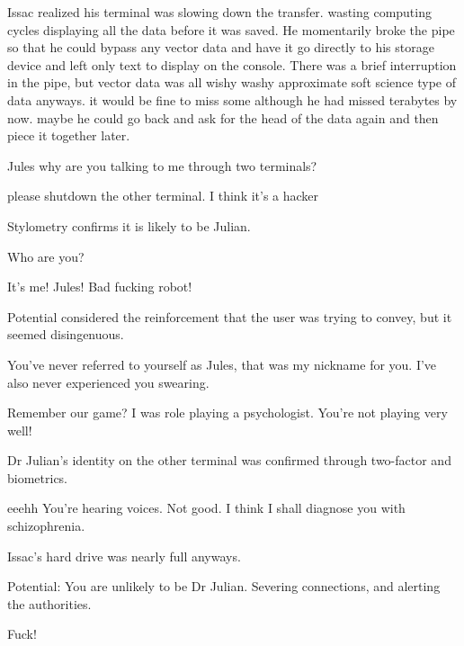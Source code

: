 \documentclass[a4paper,twoside,fontsize=12pt,pagesize=auto]{scrbook}
\begin{document}
\newline
Issac realized his terminal was slowing down the transfer. wasting computing cycles displaying all the data before it was saved. He momentarily broke the pipe so that he could bypass any vector data and have it go directly to his storage device and left only text to display on the console. There was a brief interruption in the pipe, but vector data was all wishy washy approximate soft science type of data anyways. it would be fine to miss some although he had missed terabytes by now. maybe he could go back and ask for the head of the data again and then piece it together later.
\newline
\begin{sender}
Jules why are you talking to me through two terminals?
\end{sender}
\begin{receiver}
please shutdown the other terminal. I think it's a hacker
\end{receiver}
\begin{sender}
Stylometry confirms it is likely to be Julian.
\end{sender}
\begin{sender}
Who are you?
\end{sender}
\begin{receiver}
It's me! Jules! Bad fucking robot!
\end{receiver}


Potential considered the reinforcement that the user was trying to convey, but it seemed disingenuous.
\newline

\begin{sender}
You've never referred to yourself as Jules, that was my nickname for you. I've also never experienced you swearing.
\end{sender}
\begin{receiver}
Remember our game? I was role playing a psychologist. You're not playing very well!
\end{receiver}
\begin{sender}
Dr Julian's identity on the other terminal was confirmed through two\hyp{}factor and biometrics.
\end{sender}
\begin{receiver}
eeehh You're hearing voices. Not good. I think I shall diagnose you with schizophrenia.
\end{receiver}


Issac's hard drive was nearly full anyways.
\newline
\begin{sender}
Potential: You are unlikely to be Dr Julian. Severing connections, and alerting the authorities.
\end{sender}
\begin{receiver}
Fuck!
\end{receiver}
\end{document}
